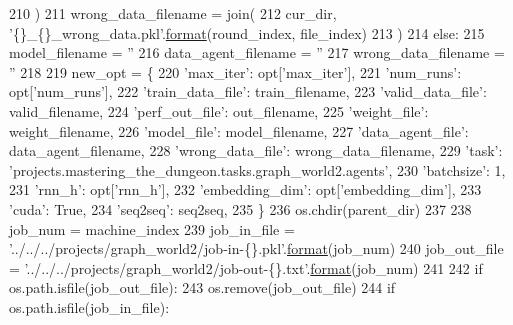 \begin{DoxyCode}
210         )
211         wrong\_data\_filename = join(
212             cur\_dir, \textcolor{stringliteral}{'\{\}\_\{\}\_wrong\_data.pkl'}.\hyperlink{namespaceparlai_1_1chat__service_1_1services_1_1messenger_1_1shared__utils_a32e2e2022b824fbaf80c747160b52a76}{format}(round\_index, file\_index)
213         )
214     \textcolor{keywordflow}{else}:
215         model\_filename = \textcolor{stringliteral}{''}
216         data\_agent\_filename = \textcolor{stringliteral}{''}
217         wrong\_data\_filename = \textcolor{stringliteral}{''}
218 
219     new\_opt = \{
220         \textcolor{stringliteral}{'max\_iter'}: opt[\textcolor{stringliteral}{'max\_iter'}],
221         \textcolor{stringliteral}{'num\_runs'}: opt[\textcolor{stringliteral}{'num\_runs'}],
222         \textcolor{stringliteral}{'train\_data\_file'}: train\_filename,
223         \textcolor{stringliteral}{'valid\_data\_file'}: valid\_filename,
224         \textcolor{stringliteral}{'perf\_out\_file'}: out\_filename,
225         \textcolor{stringliteral}{'weight\_file'}: weight\_filename,
226         \textcolor{stringliteral}{'model\_file'}: model\_filename,
227         \textcolor{stringliteral}{'data\_agent\_file'}: data\_agent\_filename,
228         \textcolor{stringliteral}{'wrong\_data\_file'}: wrong\_data\_filename,
229         \textcolor{stringliteral}{'task'}: \textcolor{stringliteral}{'projects.mastering\_the\_dungeon.tasks.graph\_world2.agents'},
230         \textcolor{stringliteral}{'batchsize'}: 1,
231         \textcolor{stringliteral}{'rnn\_h'}: opt[\textcolor{stringliteral}{'rnn\_h'}],
232         \textcolor{stringliteral}{'embedding\_dim'}: opt[\textcolor{stringliteral}{'embedding\_dim'}],
233         \textcolor{stringliteral}{'cuda'}: \textcolor{keyword}{True},
234         \textcolor{stringliteral}{'seq2seq'}: seq2seq,
235     \}
236     os.chdir(parent\_dir)
237 
238     job\_num = machine\_index %
239     job\_in\_file = \textcolor{stringliteral}{'../../../projects/graph\_world2/job-in-\{\}.pkl'}.\hyperlink{namespaceparlai_1_1chat__service_1_1services_1_1messenger_1_1shared__utils_a32e2e2022b824fbaf80c747160b52a76}{format}(job\_num)
240     job\_out\_file = \textcolor{stringliteral}{'../../../projects/graph\_world2/job-out-\{\}.txt'}.\hyperlink{namespaceparlai_1_1chat__service_1_1services_1_1messenger_1_1shared__utils_a32e2e2022b824fbaf80c747160b52a76}{format}(job\_num)
241 
242     \textcolor{keywordflow}{if} os.path.isfile(job\_out\_file):
243         os.remove(job\_out\_file)
244     \textcolor{keywordflow}{if} os.path.isfile(job\_in\_file):

\end{DoxyCode}
